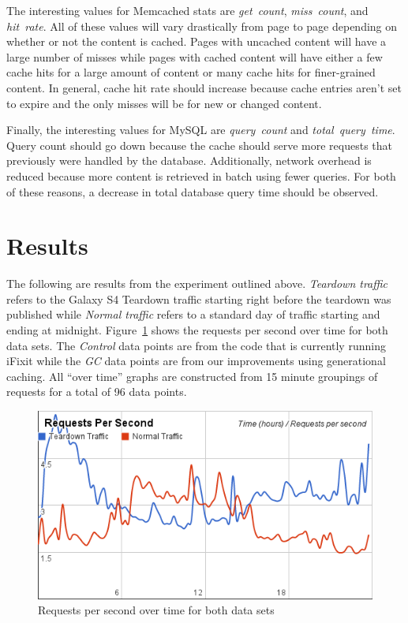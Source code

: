 \documentclass[12pt]{ucthesis}
\begin{document}
The interesting values for \textsf{Memcached} stats are \textit{get~count}, \textit{miss~count}, and \textit{hit~rate}.
All of these values will vary drastically from page to page depending on whether or not the content is cached.
Pages with uncached content will have a large number of misses while pages with cached content will have either a few cache hits for a large amount of content or many cache hits for finer-grained content.
In general, cache hit rate should increase because cache entries aren't set to expire and the only misses will be for new or changed content.

Finally, the interesting values for \textsf{MySQL} are \textit{query~count} and \textit{total~query~time}.
Query count should go down because the cache should serve more requests that previously were handled by the database.
Additionally, network overhead is reduced because more content is retrieved in batch using fewer queries.
For both of these reasons, a decrease in total database query time should be observed.

\section{Results} \label{results}
The following are results from the experiment outlined above.
\textit{Teardown traffic} refers to the Galaxy S4 Teardown traffic starting right before the teardown was published while \textit{Normal traffic} refers to a standard day of traffic starting and ending at midnight.
Figure~\ref{fig:requestsPerSecXTime} shows the requests per second over time for both data sets.
The \textit{Control} data points are from the code that is currently running \textsf{iFixit} while the \textit{GC} data points are from our improvements using generational caching.
All ``over time'' graphs are constructed from 15 minute groupings of requests for a total of 96 data points.

\begin{figure}[h]
\centering
\includegraphics[width=\textwidth]{assets/requestsPerSecXTime.png}
\caption{Requests per second over time for both data sets}
\label{fig:requestsPerSecXTime}
\end{figure}
\end{document}
